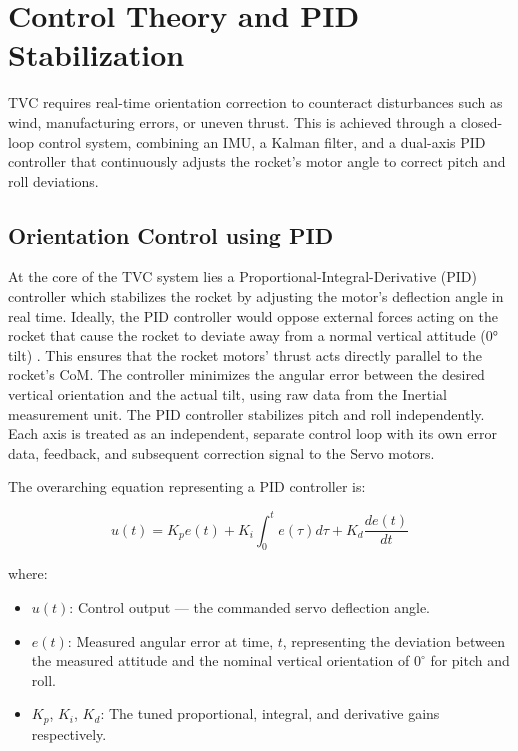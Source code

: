 \section{Control Theory and PID Stabilization}

TVC requires real-time orientation correction to counteract disturbances such as wind, manufacturing errors, or uneven thrust. This is achieved through a closed-loop control system, combining an IMU, a Kalman filter, and a dual-axis PID controller that continuously adjusts the rocket’s motor angle to correct pitch and roll deviations. 


\subsection{Orientation Control using PID}

At the core of the TVC system lies a Proportional-Integral-Derivative (PID) controller which stabilizes the rocket by adjusting the motor’s deflection angle in real time. Ideally, the PID controller would oppose external forces acting on the rocket that cause the rocket to deviate away from a normal vertical attitude (0° tilt) . This ensures that the rocket motors’ thrust acts directly parallel to the rocket’s CoM. The controller minimizes the angular error between the desired vertical orientation and the actual tilt, using raw data from the Inertial measurement unit. The PID controller stabilizes pitch and roll independently. Each axis is treated as an independent, separate control loop with its own error data, feedback, and subsequent correction signal to the Servo motors. 


The overarching equation representing a PID controller is:


\[
u(t) = K_p e(t) + K_i \int_0^t e(\tau)d\tau + K_d \frac{de(t)}{dt}
\]

where:

\begin{itemize}
    \item $u(t)$: Control output — the commanded servo deflection angle.
    \item $e(t)$: Measured angular error at time, $t$, representing the deviation between the measured attitude and the nominal vertical orientation of $0^\circ$ for pitch and roll.
    \item $K_p$, $K_i$, $K_d$: The tuned proportional, integral, and derivative gains respectively.
\end{itemize}

